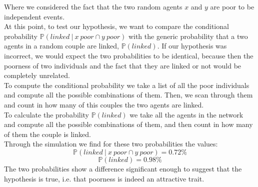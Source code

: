 Where we considered the fact that the two random agents $x$ and $y$ are poor to be independent events. \\
At this point, to test our hypothesis, we want to compare the conditional probability $\mathbb{P}(linked \: \vert \: x \: poor \cap y \: poor)$ with the generic probability that a two agents in a random couple are linked, $\mathbb{P}(linked)$. If our hypothesis was incorrect, we would expect the two probabilities to be identical, because then the poorness of two individuals and the fact that they are linked or not would be completely unrelated. \\
To compute the conditional probability we take a list of all the poor individuals and compute all the possible combinations of them. Then, we scan through them and count in how many of this couples the two agents are linked. \\
To calculate the probability $\mathbb{P}(linked)$ we take all the agents in the network and compute all the possible combinations of them, and then count in how many of them the couple is linked. \\
Through the simulation we find for these two probabilities the values:
\begin{equation*}
	\mathbb{P}(linked \ \vert \ x \ poor \cap y \ poor) = 0.72\%
\end{equation*}
\begin{equation*}
	\mathbb{P}(linked) = 0.98\%
\end{equation*}
The two probabilities show a difference significant enough to suggest that the hypothesis is true, i.e. that poorness is indeed an attractive trait.
